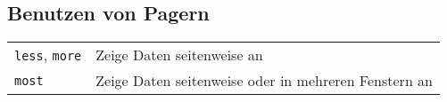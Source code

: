 \documentclass[10pt,a4paper]{article}
\begin{document}
\begin{multicols}{2}
\section{Benutzen von Pagern}
\begin{tabular}{ p{2.5cm} p{8.5cm} }
  \hline
  \texttt{less}, \texttt{more} & Zeige Daten seitenweise an \\
  \texttt{most} & Zeige Daten seitenweise oder in mehreren Fenstern an \\
  \hline
\end{tabular}




\end{multicols}

\newpage

\cheatsheet
\end{document}

